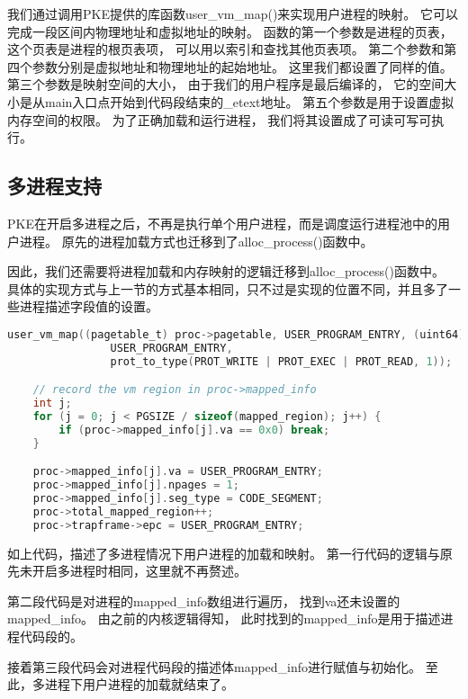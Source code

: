 我们通过调用PKE提供的库函数user\_vm\_map()来实现用户进程的映射。
它可以完成一段区间内物理地址和虚拟地址的映射。
函数的第一个参数是进程的页表，这个页表是进程的根页表项，
可以用以索引和查找其他页表项。
第二个参数和第四个参数分别是虚拟地址和物理地址的起始地址。
这里我们都设置了同样的值。
第三个参数是映射空间的大小，
由于我们的用户程序是最后编译的，
它的空间大小是从main入口点开始到代码段结束的\_etext地址。
第五个参数是用于设置虚拟内存空间的权限。
为了正确加载和运行进程，
我们将其设置成了可读可写可执行。


\subsection{多进程支持}

PKE在开启多进程之后，不再是执行单个用户进程，而是调度运行进程池中的用户进程。
原先的进程加载方式也迁移到了alloc\_process()函数中。

因此，我们还需要将进程加载和内存映射的逻辑迁移到alloc\_process()函数中。
具体的实现方式与上一节的方式基本相同，只不过是实现的位置不同，并且多了一些进程描述字段值的设置。

\begin{lstlisting}[caption={多进程情况下用户进程的加载和映射}, label={lst:user_process_map_multi}, language=C]
    user_vm_map((pagetable_t) proc->pagetable, USER_PROGRAM_ENTRY, (uint64) _etext - USER_PROGRAM_ENTRY,
                USER_PROGRAM_ENTRY,
                prot_to_type(PROT_WRITE | PROT_EXEC | PROT_READ, 1));

    // record the vm region in proc->mapped_info
    int j;
    for (j = 0; j < PGSIZE / sizeof(mapped_region); j++) {
        if (proc->mapped_info[j].va == 0x0) break;
    }

    proc->mapped_info[j].va = USER_PROGRAM_ENTRY;
    proc->mapped_info[j].npages = 1;
    proc->mapped_info[j].seg_type = CODE_SEGMENT;
    proc->total_mapped_region++;
    proc->trapframe->epc = USER_PROGRAM_ENTRY;    
\end{lstlisting}

如上代码，描述了多进程情况下用户进程的加载和映射。
第一行代码的逻辑与原先未开启多进程时相同，这里就不再赘述。

第二段代码是对进程的mapped\_info数组进行遍历，
找到va还未设置的mapped\_info。
由之前的内核逻辑得知，
此时找到的mapped\_info是用于描述进程代码段的。

接着第三段代码会对进程代码段的描述体mapped\_info进行赋值与初始化。
至此，多进程下用户进程的加载就结束了。


